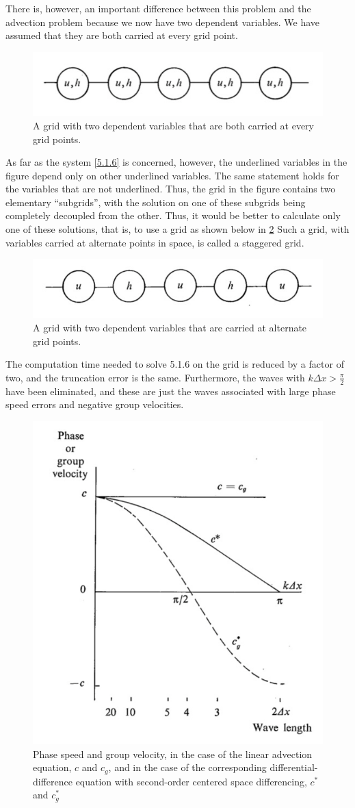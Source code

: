 There is, however, an important difference between this problem and the advection problem because we now have two dependent variables. We have assumed that they are both carried at every grid point.\begin{figure}[h]
	\centering
	\includegraphics[width=0.5\linewidth]{uploads/Screenshot 2024-11-13 180623.png}
	\caption{A grid with two dependent variables that are both carried at every grid points.}
	\label{fig:5.1.3}
\end{figure}
As far as the system \ref{5.1.6} is concerned, however, the underlined variables in the figure depend only on other underlined variables. The same statement holds for the variables that are not underlined. Thus, the grid in the figure contains two elementary “subgrids”, with the solution on one of these subgrids being completely decoupled from the other. Thus, it would be better to calculate only one of these solutions, that is, to use a grid as shown below in \ref{fig:5.1.4} Such a grid, with variables carried at alternate points in space, is called a staggered grid.
\begin{figure}[h]
	\centering
	\includegraphics[width=0.5\linewidth]{uploads/Screenshot 2024-11-13 180824.png}
	\caption{A grid with two dependent variables that are carried at alternate grid points.}
	\label{fig:5.1.4}
\end{figure}
The computation time needed to solve 5.1.6 on the grid is reduced by a factor of two, and the truncation error is the same. Furthermore, the waves with $k\Delta x>\frac{\pi}{2}$ have been eliminated, and these are just the waves associated with large phase speed errors and negative group velocities.
\begin{figure}[h!]
	\centering
	\includegraphics[width=0.45\linewidth]{uploads/Screenshot 2024-11-14 112837.png}
	\caption{Phase speed and group velocity, in the case of the linear advection equation, $c$ and $c_g$, and in the case of the corresponding differential-difference equation with second-order centered space differencing, $c^*$ and $c^*_g$}
	\label{fig:4.2.2}
\end{figure}


